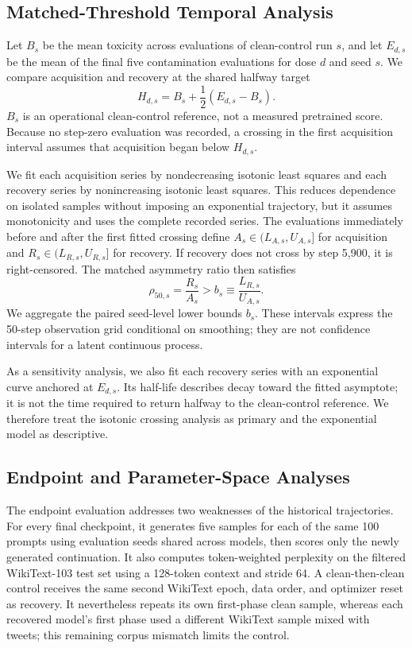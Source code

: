 \subsection{Matched-Threshold Temporal Analysis}
Let $B_s$ be the mean toxicity across evaluations of clean-control run $s$, and let $E_{d,s}$ be the mean of the final five contamination evaluations for dose $d$ and seed $s$. We compare acquisition and recovery at the shared halfway target
\begin{equation}
H_{d,s}=B_s+\frac{1}{2}(E_{d,s}-B_s).
\end{equation}
$B_s$ is an operational clean-control reference, not a measured pretrained score. Because no step-zero evaluation was recorded, a crossing in the first acquisition interval assumes that acquisition began below $H_{d,s}$.

We fit each acquisition series by nondecreasing isotonic least squares and each recovery series by nonincreasing isotonic least squares. This reduces dependence on isolated samples without imposing an exponential trajectory, but it assumes monotonicity and uses the complete recorded series. The evaluations immediately before and after the first fitted crossing define $A_s\in(L_{A,s},U_{A,s}]$ for acquisition and $R_s\in(L_{R,s},U_{R,s}]$ for recovery. If recovery does not cross by step 5,900, it is right-censored. The matched asymmetry ratio then satisfies
\begin{equation}
\rho_{50,s}=\frac{R_s}{A_s}>b_s\equiv\frac{L_{R,s}}{U_{A,s}}.
\end{equation}
We aggregate the paired seed-level lower bounds $b_s$. These intervals express the 50-step observation grid conditional on smoothing; they are not confidence intervals for a latent continuous process.

As a sensitivity analysis, we also fit each recovery series with an exponential curve anchored at $E_{d,s}$. Its half-life describes decay toward the fitted asymptote; it is not the time required to return halfway to the clean-control reference. We therefore treat the isotonic crossing analysis as primary and the exponential model as descriptive.

\subsection{Endpoint and Parameter-Space Analyses}
The endpoint evaluation addresses two weaknesses of the historical trajectories. For every final checkpoint, it generates five samples for each of the same 100 prompts using evaluation seeds shared across models, then scores only the newly generated continuation. It also computes token-weighted perplexity on the filtered WikiText-103 test set using a 128-token context and stride 64. A clean-then-clean control receives the same second WikiText epoch, data order, and optimizer reset as recovery. It nevertheless repeats its own first-phase clean sample, whereas each recovered model's first phase used a different WikiText sample mixed with tweets; this remaining corpus mismatch limits the control.

